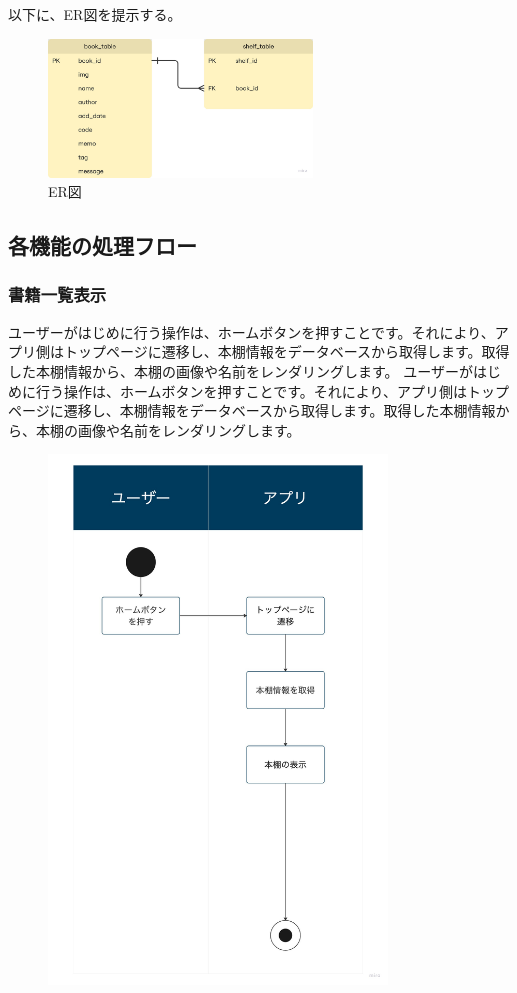 \documentclass[a4paper, 11pt, titlepage]{jsarticle}
\begin{document}
以下に、ER図を提示する。
\begin{figure}[htbp]
\centering
\includegraphics[width=70mm]{ER_diagram.jpg}
\caption{ER図}
\label{fig:func}
\end{figure}


\clearpage
\subsection{各機能の処理フロー}
\subsubsection{書籍一覧表示}
ユーザーがはじめに行う操作は、ホームボタンを押すことです。それにより、アプリ側はトップページに遷移し、本棚情報をデータベースから取得します。取得した本棚情報から、本棚の画像や名前をレンダリングします。
ユーザーがはじめに行う操作は、ホームボタンを押すことです。それにより、アプリ側はトップページに遷移し、本棚情報をデータベースから取得します。取得した本棚情報から、本棚の画像や名前をレンダリングします。
\begin{figure}[htbp]
  \centering
  \includegraphics[width=90mm]{flow-ichiran.jpg}
  \label{fig:func}
\end{figure}
\end{document}
